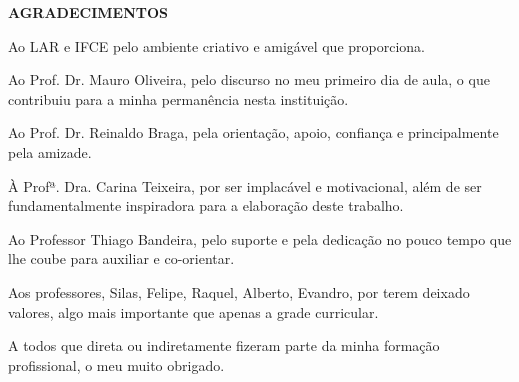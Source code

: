 \vfill
\begin{center}
{\textbf{AGRADECIMENTOS}}
\end{center}

Ao LAR e IFCE pelo ambiente criativo e amigável que proporciona.

Ao Prof. Dr. Mauro Oliveira, pelo discurso no meu primeiro dia de aula, o que contribuiu para a minha permanência nesta instituição.

Ao Prof. Dr. Reinaldo Braga, pela orientação, apoio, confiança e principalmente pela amizade.

À Profª. Dra. Carina Teixeira, por ser implacável e motivacional, além de ser fundamentalmente inspiradora para a elaboração deste trabalho.

Ao Professor Thiago Bandeira, pelo suporte e pela dedicação no pouco tempo que lhe coube para auxiliar e co-orientar.

Aos professores, Silas, Felipe, Raquel, Alberto, Evandro, por terem deixado valores, algo mais importante que apenas a grade curricular.

A todos que direta ou indiretamente fizeram parte da minha formação profissional, o meu muito obrigado.